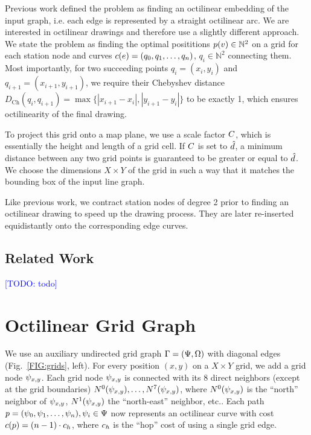 \documentclass[sigconf]{acmart}
\newcommand\TODO[1]{\textcolor{blue}{\small [TODO: #1]}}
\begin{document}
%
Previous work defined the problem as finding an octilinear embedding of the input graph, i.e. each edge is represented by a straight octilinear arc.
We are interested in octilinear drawings and therefore use a slightly different approach.
We state the problem as finding the optimal posititions $p(v) \in \mathbb{N}^2$ on a grid for each station node and curves $c(e) = (q_0, q_1, \dots, q_n)$, $q_i \in \mathbb{N}^2$ connecting them. 
Most importantly, for two succeeding points $q_i = (x_i, y_i)$ and $q_{i+1} = (x_{i+1}, y_{i+1})$, we require their Chebyshev distance $D_\text{Ch}(q_i, q_{i+1}) = \max \{|x_{i+1} - x_i|, |y_{i+1} - y_i|\}$ to be exactly 1, which ensures octilinearity of the final drawing.

To project this grid onto a map plane, we use a scale factor $C$, which is essentially the height and length of a grid cell.
If $C$ is set to $\hat d$, a minimum distance between any two grid points is guaranteed to be greater or equal to $\hat d$.
We choose the dimensions $X\times Y$ of the grid in such a way that it matches the bounding box of the input line graph.

Like previous work, we contract station nodes of degree 2 prior to finding an octilinear drawing to speed up the drawing process.
They are later re-inserted equidistantly onto the corresponding edge curves.

\subsection{Related Work}

\TODO{todo}

\section{Octilinear Grid Graph}
\label{SEC:gridgraph}

We use an auxiliary undirected grid graph $\Gamma = (\Psi, \Omega)$ with diagonal edges (Fig.~\ref{FIG:grids}, left).
For every position $(x, y)$ on a $X\times Y$ grid, we add a grid node $\psi_{x, y}$.
Each grid node $\psi_{x, y}$ is connected with its 8 direct neighbors (except at the grid boundaries) $N^0(\psi_{x, y}), \dots, N^7(\psi_{x, y})$, where $N^0(\psi_{x, y})$ is the ``north'' neighbor of $\psi_{x, y}$, $N^1(\psi_{x, y})$ the ``north-east'' neighbor, etc..
Each path $p = (\psi_0, \psi_1, \dots, \psi_n), \psi_i \in \Psi$ now represents an octilinear curve with cost $c(p) = (n - 1) \cdot c_h$, where $c_h$ is the ``hop'' cost of using a single grid edge.
\end{document}
